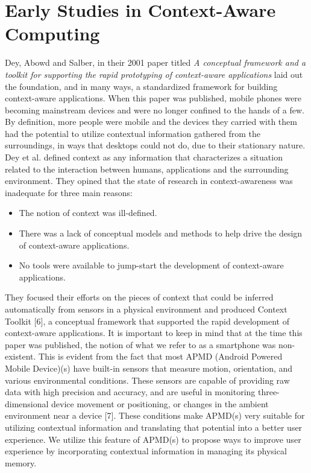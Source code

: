 \documentclass[12pt]{uthesis-v12}  %
\begin{document}
	\section{Early Studies in Context-Aware Computing}
		Dey, Abowd and Salber, in their 2001 paper titled {\em A conceptual framework and a toolkit for supporting the rapid prototyping of context-aware applications} laid out the foundation, and in many ways, a standardized framework for building context-aware applications. When this paper was published, mobile phones were becoming mainstream devices and were no longer confined to the hands of a few. By definition, more people were mobile and the devices they carried with them had the potential to utilize contextual information gathered from the surroundings, in ways that desktops could not do, due to their stationary nature. Dey et al. defined context as any information that characterizes a situation related to the interaction between humans, applications and the surrounding environment. They opined that the state of research in context-awareness was inadequate for three main reasons:
		
		\begin{itemize}
			\item The notion of context was ill-defined.
			\item There was a lack of conceptual models and methods to help drive the design of context-aware applications.
			\item No tools were available to jump-start the development of context-aware applications.
		\end{itemize}
		
		 They focused their efforts on the pieces of context that could be inferred automatically from sensors in a physical environment and produced Context Toolkit [6], a conceptual framework that supported the rapid development of context-aware applications. It is important to keep in mind that at the time this paper was published, the notion of what we refer to as a smartphone was non-existent. This is evident from the fact that most APMD (Android Powered Mobile Device)(s) have built-in sensors that measure motion, orientation, and various environmental conditions. These sensors are capable of providing raw data with high precision and accuracy, and are useful in monitoring three-dimensional device movement or positioning, or changes in the ambient environment near a device [7]. These conditions make APMD(s) very suitable for utilizing contextual information and translating that potential into a better user experience. We utilize this feature of APMD(s) to propose ways to improve user experience by incorporating contextual information in managing its physical memory.		
			
\end{document}
